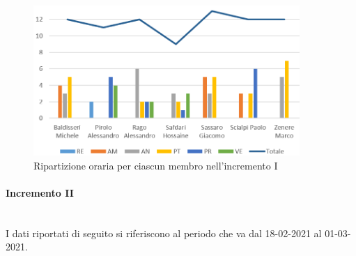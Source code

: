 \begin{figure}[!htb]   
    \centering
    \includegraphics[width=0.9\textwidth]{Images/per2}
	\caption{Ripartizione oraria per ciascun membro nell'incremento I}
\end{figure}

\paragraph{Incremento II}\mbox{} \\
I dati riportati di seguito si riferiscono al periodo che va dal 18-02-2021 al 01-03-2021.

